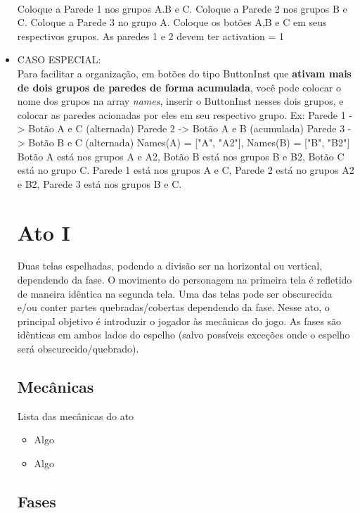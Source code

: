 \documentclass[a4paper, 11pt]{article}
\begin{document}
\begin{itemize}
				\\
				Coloque a Parede 1 nos grupos A.B e C. Coloque a Parede 2 nos grupos B e C. Coloque a Parede 3 no grupo A. Coloque os botões A,B e C em seus respectivos grupos.
				As paredes 1 e 2 devem ter activation = 1
				\item CASO ESPECIAL: \\
				Para facilitar a organização, em botões do tipo ButtonInst que \textbf{ativam mais de dois grupos de paredes de forma acumulada}, você pode colocar o nome dos grupos na array \textit{names}, inserir o ButtonInst nesses dois grupos, e colocar as paredes acionadas por eles em seu respectivo grupo.
				Ex:
				Parede 1 -> Botão A e C (alternada)
				Parede 2 -> Botão A e B (acumulada) 
 				Parede 3 -> Botão B e C (alternada)
 				Names(A) = ["A", "A2"], Names(B) = ["B", "B2"]
 				Botão A está nos grupos A e A2, Botão B está nos grupos B e B2, Botão C está no grupo C.
 				Parede 1 está nos grupos A e C, Parede 2 está no grupos A2 e B2, Parede 3 está nos grupos B e C.

\section{Ato I} 
 
	Duas telas espelhadas, podendo a divisão ser na horizontal ou vertical, dependendo da fase. O movimento do 
	personagem na primeira tela é refletido de maneira idêntica na segunda tela. Uma das telas pode ser obscurecida 
	e/ou conter partes quebradas/cobertas dependendo da fase. 
	Nesse ato, o principal objetivo é introduzir o jogador às mecânicas do jogo. As fases são idênticas 
	em ambos lados do espelho (salvo possíveis exceções onde o espelho será obscurecido/quebrado). 
 
\subsection{Mecânicas} 
 
	Lista das mecânicas do ato 
	\begin{itemize} 
		\item Algo 
		\item Algo 
	\end{itemize} 
 
\subsection{Fases} 
 

\end{itemize}
\end{document}
